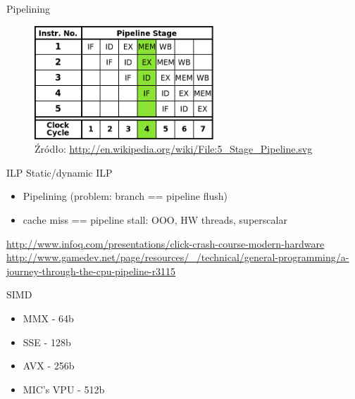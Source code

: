 \begin{frame}{Pipelining}
	\begin{figure}[h]
		\includegraphics[width=0.6\textwidth]{gfx/pipelining}
		\caption{Źródło: \url{http://en.wikipedia.org/wiki/File:5_Stage_Pipeline.svg}}
	\end{figure}
\end{frame}
\begin{frame}[fragile]{ILP}
	Static/dynamic ILP
	\begin{itemize}
		\item Pipelining (problem: branch == pipeline flush)
		\item cache miss == pipeline stall: OOO, HW threads, superscalar
	\end{itemize}
	\tiny\url{http://www.infoq.com/presentations/click-crash-course-modern-hardware}
	\tiny\url{http://www.gamedev.net/page/resources/_/technical/general-programming/a-journey-through-the-cpu-pipeline-r3115}
\end{frame}
\begin{frame}{SIMD}
	\begin{itemize}
		\item MMX - 64b
		\item SSE - 128b
		\item AVX - 256b
		\item MIC's VPU - 512b
	\end{itemize}
\end{frame}
